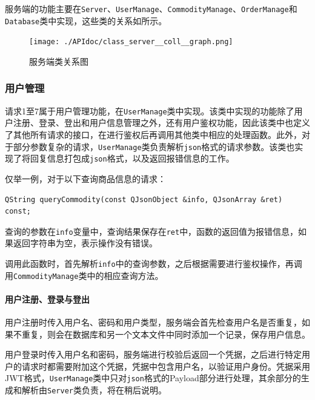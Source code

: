 \documentclass[lang=cn,11pt,a4paper,cite=authornum]{paper}
\begin{document}
服务端的功能主要在\texttt{Server}、\texttt{UserManage}、\texttt{CommodityManage}、\texttt{OrderManage}和\texttt{Database}类中实现，这些类的关系如所示。

\begin{figure}[htbp]

    \centering
    \texttt{[image: ./APIdoc/class\_server\_\_coll\_\_graph.png]}
    \caption{服务端类关系图\label{fig:serverstructure}}

\end{figure}

\subsubsection{用户管理}

请求1至7属于用户管理功能，在\texttt{UserManage}类中实现。该类中实现的功能除了用户注册、登录、登出和用户信息管理之外，还有用户鉴权功能，因此该类中也定义了其他所有请求的接口，在进行鉴权后再调用其他类中相应的处理函数。此外，对于部分参数复杂的请求，\texttt{UserManage}类负责解析\texttt{json}格式的请求参数。该类也实现了将回复信息打包成\texttt{json}格式，以及返回报错信息的工作。

仅举一例，对于以下查询商品信息的请求：

\begin{code}
\begin{verbatim} 
QString queryCommodity(const QJsonObject &info, QJsonArray &ret) const;
\end{verbatim}
\end{code}

查询的参数在\texttt{info}变量中，查询结果保存在\texttt{ret}中，函数的返回值为报错信息，如果返回字符串为空，表示操作没有错误。

调用此函数时，首先解析\texttt{info}中的查询参数，之后根据需要进行鉴权操作，再调用\texttt{CommodityManage}类中的相应查询方法。

\paragraph{用户注册、登录与登出}

用户注册时传入用户名、密码和用户类型，服务端会首先检查用户名是否重复，如果不重复，则会在数据库和另一个文本文件中同时添加一个记录，保存用户信息。

用户登录时传入用户名和密码，服务端进行校验后返回一个凭据，之后进行特定用户的请求时都需要附加这个凭据，凭据中包含用户名，以验证用户身份。凭据采用JWT格式，\texttt{UserManage}类中只对\texttt{json}格式的Payload部分进行处理，其余部分的生成和解析由\texttt{Server}类负责，将在稍后说明。
\end{document}
